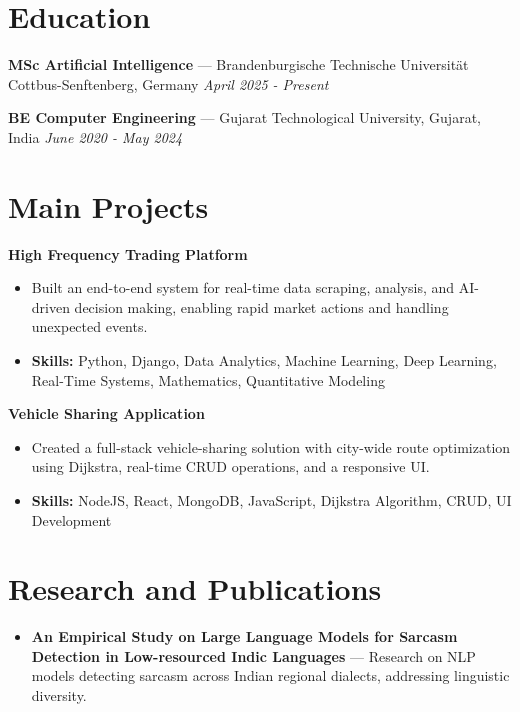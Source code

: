 \documentclass[a4paper,10pt]{article}
\begin{document}
\section*{Education}
\textbf{MSc Artificial Intelligence} — Brandenburgische Technische Universität Cottbus-Senftenberg, Germany \hfill \textit{April 2025 - Present}\par
\vspace{1.5pt}
\textbf{BE Computer Engineering} — Gujarat Technological University, Gujarat, India \hfill \textit{June 2020 - May 2024}\par

\section*{Main Projects}
\textbf{High Frequency Trading Platform}\par
\vspace{1pt}
\begin{itemize}
  \item Built an end-to-end system for real-time data scraping, analysis, and AI-driven decision making, enabling rapid market actions and handling unexpected events.
  \item \textbf{Skills:} Python, Django, Data Analytics, Machine Learning, Deep Learning, Real-Time Systems, Mathematics, Quantitative Modeling
\end{itemize}
\vspace{3pt}
\textbf{Vehicle Sharing Application}\par
\vspace{1pt}
\begin{itemize}
  \item Created a full-stack vehicle-sharing solution with city-wide route optimization using Dijkstra, real-time CRUD operations, and a responsive UI.
  \item \textbf{Skills:} NodeJS, React, MongoDB, JavaScript, Dijkstra Algorithm, CRUD, UI Development
\end{itemize}

\section*{Research and Publications}
\begin{itemize}
\item \textbf{An Empirical Study on Large Language Models for Sarcasm Detection in Low-resourced Indic Languages} — Research on NLP models detecting sarcasm across Indian regional dialects, addressing linguistic diversity.
\end{itemize}
\end{document}
